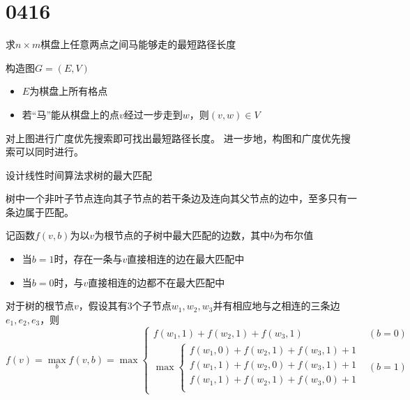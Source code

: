 \section{0416}\label{sec:0416}
\begin{questions}\label{qset:0416}

    \question 求$n \times m$棋盘上任意两点之间马能够走的最短路径长度

    \begin{solution}
        构造图$G=(E,V)$\begin{itemize}
            \item $E$为棋盘上所有格点
            \item 若“马”能从棋盘上的点$v$经过一步走到$w$，则$(v,w) \in V$
        \end{itemize}

        对上图进行广度优先搜索即可找出最短路径长度。
        进一步地，构图和广度优先搜索可以同时进行。

    \end{solution}

    \question 设计线性时间算法求树的最大匹配

    \begin{solution}
        树中一个非叶子节点连向其子节点的若干条边及连向其父节点的边中，至多只有一条边属于匹配。

        记函数$f(v, b)$为以$v$为根节点的子树中最大匹配的边数，其中$b$为布尔值\begin{itemize}
            \item 当$b=1$时，存在一条与$v$直接相连的边在最大匹配中
            \item 当$b=0$时，与$v$直接相连的边都不在最大匹配中
        \end{itemize}

        对于树的根节点$v$，假设其有3个子节点$w_1,w_2,w_3$并有相应地与之相连的三条边$e_1, e_2, e_3$，则
        \[
            f(v) = \max_b {f(v,b)} = \max \begin{cases}
                f(w_1,1) + f(w_2,1) + f(w_3,1) & (b=0) \\
                \max \begin{cases}
                    f(w_1,0) + f(w_2,1) + f(w_3,1) + 1 \\
                    f(w_1,1) + f(w_2,0) + f(w_3,1) + 1 \\
                    f(w_1,1) + f(w_2,1) + f(w_3,0) + 1 \\
                \end{cases} & (b=1)
            \end{cases}
        \]


\end{solution}
\end{questions}
